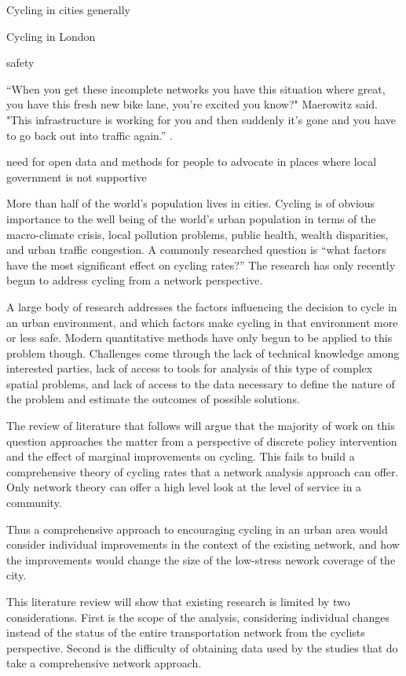 
Cycling in cities generally

Cycling in London

safety


``When you get these incomplete networks you have this situation where great, you have this fresh new bike lane, you're excited you know?" Maerowitz said. "This infrastructure is working for you and then suddenly it's gone and you have to go back out into traffic again.'' \cite{Juhasz2019}. 

need for open data and methods for people to advocate in places where local government is not supportive

More than half of the world's population lives in cities. Cycling is of obvious importance to the well being of the world's  urban population in terms of the macro-climate crisis, local pollution problems,  public health, wealth disparities, and urban traffic congestion. A commonly researched question is ``what factors have the most significant effect on cycling rates?'' The research has only recently begun to address cycling from a network perspective. 

A large body of research addresses the factors influencing the decision to cycle in an urban environment, and which factors make cycling in that environment more or less safe. Modern quantitative methods have only begun to be applied to this problem though. Challenges come through the lack of technical knowledge among interested parties, lack of access to tools for analysis of this type of complex spatial problems, and lack of access to the data necessary to define the nature of the problem and estimate the outcomes of possible solutions. 

 The review of literature that follows will argue that the majority of work on this question approaches the matter from a perspective of discrete policy intervention and the effect of marginal improvements on cycling. This fails to build a comprehensive theory of cycling rates that a network analysis approach can offer. Only network theory can offer a high level look at the level of service in a community. 

Thus a comprehensive approach to encouraging cycling in an urban area would consider individual improvements in the context of the existing network, and how the improvements would change the size of the low-stress nework coverage of the city. 

This literature review will show that existing research is limited by two considerations. First is the scope of the analysis, considering individual changes instead of the status of the entire transportation network from the cyclists perspective.  Second is the difficulty of obtaining data used by the studies that do take a comprehensive network approach. 

